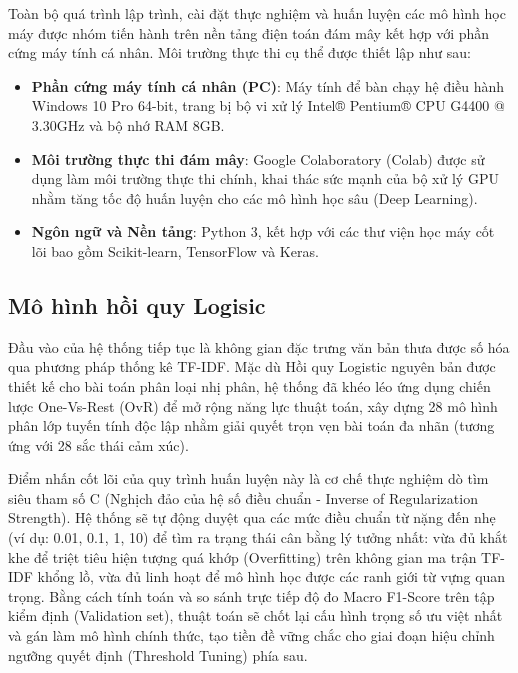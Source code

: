 Toàn bộ quá trình lập trình, cài đặt thực nghiệm và huấn luyện các mô hình học máy được nhóm tiến hành trên nền tảng điện toán đám mây kết hợp với phần cứng máy tính cá nhân. Môi trường thực thi cụ thể được thiết lập như sau:
\begin{itemize}
\item \textbf{Phần cứng máy tính cá nhân (PC)}: Máy tính để bàn chạy hệ điều hành Windows 10 Pro 64-bit, trang bị bộ vi xử lý Intel® Pentium® CPU G4400 @ 3.30GHz và bộ nhớ RAM 8GB.

\item \textbf{Môi trường thực thi đám mây}: Google Colaboratory (Colab) được sử dụng làm môi trường thực thi chính, khai thác sức mạnh của bộ xử lý GPU nhằm tăng tốc độ huấn luyện cho các mô hình học sâu (Deep Learning).

\item \textbf{Ngôn ngữ và Nền tảng}: Python 3, kết hợp với các thư viện học máy cốt lõi bao gồm Scikit-learn, TensorFlow và Keras.
\end{itemize}

\subsection{Mô hình hồi quy Logisic}

Đầu vào của hệ thống tiếp tục là không gian đặc trưng văn bản thưa được số hóa qua phương pháp thống kê TF-IDF. Mặc dù Hồi quy Logistic nguyên bản được thiết kế cho bài toán phân loại nhị phân, hệ thống đã khéo léo ứng dụng chiến lược One-Vs-Rest (OvR) để mở rộng năng lực thuật toán, xây dựng 28 mô hình phân lớp tuyến tính độc lập nhằm giải quyết trọn vẹn bài toán đa nhãn (tương ứng với 28 sắc thái cảm xúc).

Điểm nhấn cốt lõi của quy trình huấn luyện này là cơ chế thực nghiệm dò tìm siêu tham số C (Nghịch đảo của hệ số điều chuẩn - Inverse of Regularization Strength). Hệ thống sẽ tự động duyệt qua các mức điều chuẩn từ nặng đến nhẹ (ví dụ: 0.01, 0.1, 1, 10) để tìm ra trạng thái cân bằng lý tưởng nhất: vừa đủ khắt khe để triệt tiêu hiện tượng quá khớp (Overfitting) trên không gian ma trận TF-IDF khổng lồ, vừa đủ linh hoạt để mô hình học được các ranh giới từ vựng quan trọng. Bằng cách tính toán và so sánh trực tiếp độ đo Macro F1-Score trên tập kiểm định (Validation set), thuật toán sẽ chốt lại cấu hình trọng số ưu việt nhất và gán làm mô hình chính thức, tạo tiền đề vững chắc cho giai đoạn hiệu chỉnh ngưỡng quyết định (Threshold Tuning) phía sau.

